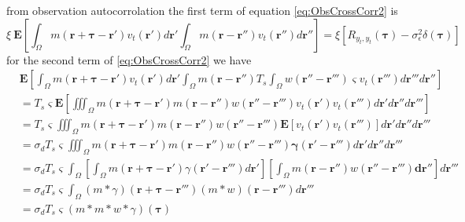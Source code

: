 \documentclass[]{article}
\begin{document}
from observation autocorrolation the first term of equation \eqref{eq:ObsCrossCorr2} is 
\begin{equation}
\xi \ \mathbf E \left[\int_{\Omega} m\left(\mathbf r + \boldsymbol \tau - \mathbf r'\right) v_t\left(\mathbf r'\right) d\mathbf r'\int_{\Omega}m\left(\mathbf r- \mathbf r''\right) v_t\left(\mathbf r''\right)d\mathbf r''\right]=\xi \left[ R_{y_{t},y_{t}}(\boldsymbol{\tau}) -\sigma_{\epsilon}^2\delta(\boldsymbol\tau)\right] 
\end{equation}
for the second term of \eqref{eq:ObsCrossCorr2} we have
\begin{align}
 &\mathbf E \left[\int_{\Omega} m\left(\mathbf r + \boldsymbol \tau - \mathbf r'\right) v_t\left(\mathbf r'\right) d\mathbf r'\int_{\Omega} m(\mathbf r-\mathbf r'')T_s\int_{\Omega}w(\mathbf r'' -\mathbf r''')\varsigma v_t(\mathbf r''')d\mathbf r''' d\mathbf r''\right ] \nonumber\\ 
&= T_s \varsigma \mathbf E \left[\iiint_{\Omega} m\left(\mathbf r + \boldsymbol \tau - \mathbf r'\right)m(\mathbf r-\mathbf r'')  w(\mathbf r'' -\mathbf r''') v_t\left(\mathbf r'\right) v_t(\mathbf r''')d\mathbf r' d\mathbf r'' d\mathbf r''' \right] \nonumber \\
 &= T_s \varsigma\iiint_{\Omega} m\left(\mathbf r + \boldsymbol \tau - \mathbf r'\right)m(\mathbf r-\mathbf r'')  w(\mathbf r'' -\mathbf r''')  \mathbf E \left[v_t\left(\mathbf r'\right) v_t(\mathbf r''')\right] d\mathbf r' d\mathbf r'' d\mathbf r''' \nonumber \\
&= \sigma_dT_s \varsigma\iiint_{\Omega} m\left(\mathbf r + \boldsymbol \tau - \mathbf r'\right)m(\mathbf r-\mathbf r'')  w(\mathbf r'' -\mathbf r''')  \mathbf \gamma(\mathbf r'-\mathbf r''') d\mathbf r' d\mathbf r'' d\mathbf r''' \nonumber \\
 &= \sigma_dT_s \varsigma\int_{\Omega} \left[ \int_{\Omega}m\left(\mathbf r + \boldsymbol \tau - \mathbf r'\right)\gamma(\mathbf r'-\mathbf r''')d\mathbf r'\right] \left[\int_{\Omega}m(\mathbf r-\mathbf r'')  w(\mathbf r'' -\mathbf r''')  \mathbf   d\mathbf r''\right] d\mathbf r''' \nonumber \\ 
 &= \sigma_d T_s \varsigma\int_{\Omega}(m \ast \gamma)(\mathbf r+\boldsymbol\tau-\mathbf r''')(m \ast w)(\mathbf r-\mathbf r''') d\mathbf r''' \nonumber \\ 
&= \sigma_dT_s\varsigma\left(m\ast m\ast w\ast\gamma\right)\left(\boldsymbol\tau\right)                                                                                                                                                                                                                                                             \end{align}
\end{document}
